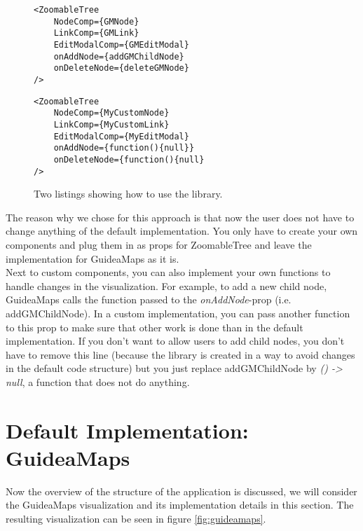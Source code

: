 \begin{figure}[H]
	\begin{minipage}{0.5\textwidth}
 		 \centering
		 \begin{verbatim}
<ZoomableTree
    NodeComp={GMNode}
    LinkComp={GMLink}
    EditModalComp={GMEditModal}
    onAddNode={addGMChildNode}
    onDeleteNode={deleteGMNode}
/>
		\end{verbatim}
		\label{lst:default-components}
	\end{minipage}
 	\begin{minipage}{0.5\textwidth}
  		\centering
  		\begin{verbatim}
<ZoomableTree
    NodeComp={MyCustomNode}
    LinkComp={MyCustomLink}
    EditModalComp={MyEditModal}
    onAddNode={function(){null}}
    onDeleteNode={function(){null}
/>
		\end{verbatim}
		\label{lst:custom-components}
 	\end{minipage}
	\caption{Two listings showing how to use the library.}
	\label{fig:examplecode-library}
\end{figure}

The reason why we chose for this approach is that now the user does not have to change anything of the default implementation. You only have to create your own components and plug them in as props for ZoomableTree and leave the implementation for GuideaMaps as it is.\\

Next to custom components, you can also implement your own functions to handle changes in the visualization. For example, to add a new child node, GuideaMaps calls the function passed to the \textit{onAddNode}-prop (i.e. addGMChildNode). In a custom implementation, you can pass another function to this prop to make sure that other work is done than in the default implementation. If you don't want to allow users to add child nodes, you don't have to remove this line (because the library is created in a way to avoid changes in the default code structure) but you just replace addGMChildNode by \textit{() -> null}, a function that does not do anything.



\section{Default Implementation: GuideaMaps}
Now the overview of the structure of the application is discussed, we will consider the GuideaMaps visualization and its implementation details in this section. The resulting visualization can be seen in figure \ref{fig:guideamaps}.
 
